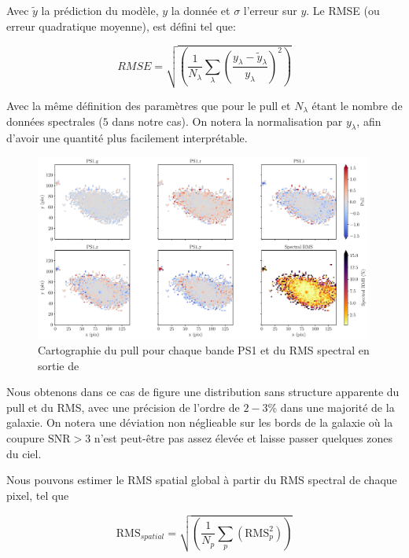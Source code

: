 \documentclass[../main/main.tex]{subfiles}
\begin{document}
Avec $\widetilde{y}$ la prédiction du modèle, $y$ la donnée et $\sigma$
l'erreur sur $y$.
Le RMSE (ou erreur quadratique moyenne), est défini tel que:

\begin{equation}
  \label{eq:rms}
  RMSE = \sqrt{\left(\frac{1}{N_{\lambda}}\sum_{\lambda}\left(\frac{y_{\lambda} - \widetilde{y}_{\lambda}}{y_{\lambda}}\right)^{2} \right)}
\end{equation}

Avec la même définition des paramètres que pour le pull et $N_{\lambda}$
étant le nombre de données spectrales ($5$ dans notre cas). On notera la
normalisation par $y_{\lambda}$, afin d'avoir une quantité plus
facilement interprétable.

\begin{figure}[ht]
  \centering
  \includegraphics[width=0.99\textwidth]{../figures/05_sedfit/cigale_pullrms_ZTF18accrorf.pdf}
  \caption[Cartographie du pull et du RMS en sortie de
  \cigale]{Cartographie du pull pour chaque bande PS1 et du RMS spectral en sortie de \cigale}
  \label{fig:cigale_pullrms}
\end{figure}

Nous obtenons dans ce cas de figure une distribution sans structure
apparente du pull et du RMS, avec une précision de l'ordre de $2-3$\%
dans une majorité de la galaxie. On notera une déviation non néglieable
sur les bords de la galaxie où la coupure $\text{SNR}>3$ n'est peut-être pas
assez élevée et laisse passer quelques zones du ciel.

Nous pouvons estimer le RMS spatial global à partir du RMS spectral de
chaque pixel, tel que

\begin{equation}
\text{RMS}_{spatial} =\sqrt{\left(\frac{1}{N_{p}}\sum\limits_{p} \left(\text{RMS}^{2}_{p}\right)\right)}
\end{equation}
\end{document}

